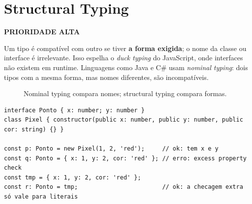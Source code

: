 \documentclass[12pt,a4paper,oneside]{book}
\newcommand{\alta}{\colorbox{red!15}{\sffamily\scriptsize\bfseries PRIORIDADE ALTA}}
\begin{document}
\section{Structural Typing}
\label{sec:structural}
\alta

Um tipo é compatível com outro se tiver \textbf{a forma exigida}; o nome da classe ou interface é irrelevante. Isso espelha o \emph{duck typing} do JavaScript, onde interfaces não existem em runtime. Linguagens como Java e C\# usam \emph{nominal typing}: dois tipos com a mesma forma, mas nomes diferentes, são incompatíveis.

\begin{figure}[h]
\centering
{}
\caption{Nominal typing compara nomes; structural typing compara formas.}
\end{figure}

\begin{verbatim}
interface Ponto { x: number; y: number }
class Pixel { constructor(public x: number, public y: number, public cor: string) {} }

const p: Ponto = new Pixel(1, 2, 'red');     // ok: tem x e y
const q: Ponto = { x: 1, y: 2, cor: 'red' }; // erro: excess property check
const tmp = { x: 1, y: 2, cor: 'red' };
const r: Ponto = tmp;                        // ok: a checagem extra só vale para literais
\end{verbatim}
\end{document}
